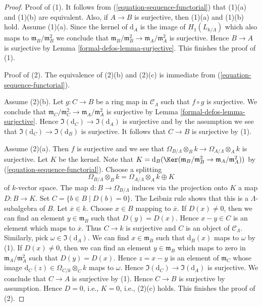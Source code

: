 \begin{proof}
Proof of (1). It follows from (\ref{equation-sequence-functorial})
that (1)(a) and (1)(b) are equivalent. Also, if
$A \to B$ is surjective, then (1)(a) and (1)(b) hold. Assume (1)(a).
Since the kernel of $\text{d}_A$ is the image of
$H_1(L_{k/\Lambda})$ which also maps to
$\mathfrak m_B/\mathfrak m_B^2$ we conclude that
$\mathfrak m_B/\mathfrak m_B^2 \to \mathfrak m_A/\mathfrak m_A^2$
is surjective. Hence $B \to A$ is surjective by
Lemma \ref{formal-defos-lemma-surjective}. This finishes the proof of (1).

\medskip\noindent
Proof of (2). The equivalence of (2)(b) and (2)(c) is immediate from
(\ref{equation-sequence-functorial}).

\medskip\noindent
Assume (2)(b). Let $g : C \to B$ be a ring map in $\mathcal{C}_\Lambda$
such that $f \circ g$ is surjective. We conclude that
$\mathfrak m_C/\mathfrak m_C^2 \to \mathfrak m_A/\mathfrak m_A^2$
is surjective by
Lemma \ref{formal-defos-lemma-surjective}.
Hence
$\Im(\text{d}_C) \to \Im(\text{d}_A)$ is surjective
and by the assumption we see that
$\Im(\text{d}_C) \to \Im(\text{d}_B)$ is surjective.
It follows that $C \to B$ is surjective by (1).

\medskip\noindent
Assume (2)(a). Then $f$ is surjective and we see that
$\Omega_{B/\Lambda} \otimes_B k \to \Omega_{A/\Lambda} \otimes_A k$
is surjective. Let $K$ be the kernel. Note that
$K = \text{d}_B(\Ker(\mathfrak m_B/\mathfrak m_B^2 \to
\mathfrak m_A/\mathfrak m_A^2))$ by (\ref{equation-sequence-functorial}).
Choose a splitting
$$
\Omega_{B/\Lambda} \otimes_B k =
\Omega_{A/\Lambda} \otimes_A k \oplus K
$$
of $k$-vector space. The map $\text{d} : B \to \Omega_{B/\Lambda}$
induces via the projection onto $K$ a map $D : B \to K$. Set
$C = \{b \in B \mid D(b) = 0\}$. The Leibniz rule shows that this is
a $\Lambda$-subalgebra of $B$. Let $\overline{x} \in k$. Choose $x \in B$
mapping to $\overline{x}$. If $D(x) \not = 0$, then we can find an element
$y \in \mathfrak m_B$ such that $D(y) = D(x)$. Hence $x - y \in C$ is
an element which maps to $\overline{x}$. Thus $C \to k$ is surjective
and $C$ is an object of $\mathcal{C}_\Lambda$. Similarly, pick
$\omega \in \Im(\text{d}_A)$. We can find $x \in \mathfrak m_B$
such that $\text{d}_B(x)$ maps to $\omega$ by (1). If $D(x) \not = 0$, then
we can find an element $y \in \mathfrak m_B$ which maps to zero
in $\mathfrak m_A/\mathfrak m_A^2$ such that $D(y) = D(x)$.
Hence $z = x - y$ is an element of $\mathfrak m_C$ whose
image $\text{d}_C(z) \in \Omega_{C/k} \otimes_C k$ maps to $\omega$.
Hence $\Im(\text{d}_C) \to \Im(\text{d}_A)$ is surjective.
We conclude that $C \to A$ is surjective by (1). Hence $C \to B$ is
surjective by assumption. Hence $D = 0$, i.e., $K = 0$, i.e., (2)(c) holds.
This finishes the proof of (2).


\end{proof}
